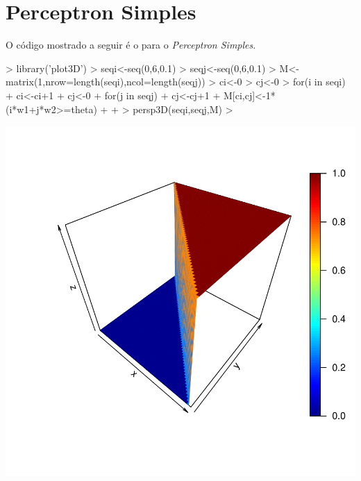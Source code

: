 \documentclass{article}
\begin{document}
\section{Perceptron Simples}

O código mostrado a seguir é o para o \textit{Perceptron Simples}.

\begin{Schunk}
\begin{Sinput}
>   library('plot3D')
>   seqi<-seq(0,6,0.1)
>   seqj<-seq(0,6,0.1)
>   M<-matrix(1,nrow=length(seqi),ncol=length(seqj))
>   ci<-0
>   cj<-0
>   for(i in seqi) {
+     ci<-ci+1
+     cj<-0
+     for(j in seqj) {
+       cj<-cj+1
+       M[ci,cj]<-1*(i*w1+j*w2>=theta)
+     }
+   }
>   persp3D(seqi,seqj,M)
>   
\end{Sinput}
\end{Schunk}
\includegraphics{perceptron_simples-002}
\end{document}
